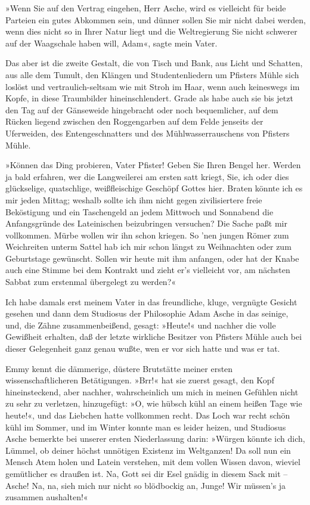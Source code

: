 »Wenn Sie auf den Vertrag eingehen, Herr Asche, wird es vielleicht
für beide Parteien ein gutes Abkommen sein, und dünner sollen Sie
mir nicht dabei werden, wenn dies nicht so in Ihrer Natur liegt und
die Weltregierung Sie nicht schwerer auf der Waagschale haben will,
Adam«, sagte mein Vater.

Das aber ist die zweite Gestalt, die von Tisch und Bank, aus Licht
und Schatten, aus alle dem Tumult, den Klängen und Studentenliedern
um Pfisters Mühle sich loslöst und vertraulich-seltsam wie mit
Stroh im Haar, wenn auch keineswegs im Kopfe, in diese Traumbilder
hineinschlendert. Grade als habe auch sie bis jetzt den Tag auf der
Gänseweide hingebracht oder noch bequemlicher, auf dem Rücken
liegend zwischen den Roggengarben auf dem Felde jenseits der
Uferweiden, des Entengeschnatters und des Mühlwasserrauschens von
Pfisters Mühle.

»Können das Ding probieren, Vater Pfister! Geben Sie Ihren Bengel
her. Werden ja bald erfahren, wer die Langweilerei am ersten satt
kriegt, Sie, ich oder dies glückselige, quatschlige, weißfleischige
Geschöpf Gottes hier. Braten könnte ich es mir jeden Mittag;
weshalb sollte ich ihm nicht gegen zivilisiertere freie Beköstigung
und ein Taschengeld an jedem Mittwoch und Sonnabend die
Anfangsgründe des Lateinischen beizubringen versuchen? Die Sache
paßt mir vollkommen. Mürbe wollen wir ihn schon kriegen. So 'nen
jungen Römer zum Weichreiten unterm Sattel hab ich mir schon längst
zu Weihnachten oder zum Geburtstage gewünscht. Sollen wir heute mit
ihm anfangen, oder hat der Knabe auch eine Stimme bei dem Kontrakt
und zieht er's vielleicht vor, am nächsten Sabbat zum erstenmal
übergelegt zu werden?«

Ich habe damals erst meinem Vater in das freundliche, kluge,
vergnügte Gesicht gesehen und dann dem Studiosus der Philosophie
Adam Asche in das seinige, und, die Zähne zusammenbeißend, gesagt:
»Heute!« und nachher die volle Gewißheit erhalten, daß der letzte
wirkliche Besitzer von Pfisters Mühle auch bei dieser Gelegenheit
ganz genau wußte, wen er vor sich hatte und was er tat.

Emmy kennt die dämmerige, düstere Brutstätte meiner ersten
wissenschaftlicheren Betätigungen. »Brr!« hat sie zuerst gesagt,
den Kopf hineinsteckend, aber nachher, wahrscheinlich um mich in
meinen Gefühlen nicht zu sehr zu verletzen, hinzugefügt: »O, wie
hübsch kühl an einem heißen Tage wie heute!«, und das Liebchen
hatte vollkommen recht. Das Loch war recht schön kühl im Sommer,
und im Winter konnte man es leider heizen, und Studiosus Asche
bemerkte bei unserer ersten Niederlassung darin: »Würgen könnte ich
dich, Lümmel, ob deiner höchst unnötigen Existenz im Weltganzen! Da
soll nun ein Mensch Atem holen und Latein verstehen, mit dem vollen
Wissen davon, wieviel gemütlicher es draußen ist. Na, Gott sei dir
Esel gnädig in diesem Sack mit – Asche! Na, na, sieh mich nur nicht
so blödbockig an, Junge! Wir müssen's ja zusammen aushalten!«

